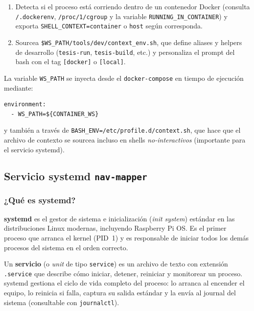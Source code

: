 \begin{enumerate}
  \item Detecta si el proceso está corriendo dentro de un contenedor Docker
        (consulta \texttt{/.dockerenv}, \texttt{/proc/1/cgroup} y la
        variable \texttt{RUNNING\_IN\_CONTAINER}) y exporta
        \texttt{SHELL\_CONTEXT=container} o \texttt{host} según corresponda.
  \item Sourcea \texttt{\$WS\_PATH/tools/dev/context\_env.sh}, que define
        aliases y helpers de desarrollo (\texttt{tesis-run}, \texttt{tesis-build},
        etc.) y personaliza el prompt del bash con el tag \texttt{[docker]}
        o \texttt{[local]}.
\end{enumerate}

La variable \texttt{WS\_PATH} se inyecta desde el \texttt{docker-compose}
en tiempo de ejecución mediante:

\begin{verbatim}
environment:
  - WS_PATH=${CONTAINER_WS}
\end{verbatim}

y también a través de \texttt{BASH\_ENV=/etc/profile.d/context.sh}, que
hace que el archivo de contexto se sourcea incluso en shells
\emph{no-interactivos} (importante para el servicio systemd).

\subsection{Servicio systemd \texttt{nav-mapper}}
\label{sec:systemd-service}

\subsubsection{¿Qué es systemd?}

\textbf{systemd} es el gestor de sistema e inicialización (\emph{init system})
estándar en las distribuciones Linux modernas, incluyendo Raspberry Pi OS.
Es el primer proceso que arranca el kernel (PID~1) y es responsable de
iniciar todos los demás procesos del sistema en el orden correcto.

Un \textbf{servicio} (o \emph{unit} de tipo \texttt{service}) es un
archivo de texto con extensión \texttt{.service} que describe cómo
iniciar, detener, reiniciar y monitorear un proceso. systemd gestiona el
ciclo de vida completo del proceso: lo arranca al encender el equipo, lo
reinicia si falla, captura su salida estándar y la envía al journal del
sistema (consultable con \texttt{journalctl}).

